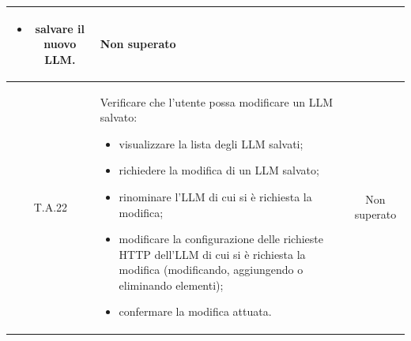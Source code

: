 \begin{tabularx}{\textwidth}{|c|X|c|}
\begin{itemize}
                            \item salvare il nuovo LLM.
                        \end{itemize} & Non superato\\ %
    \hline
    \label{ta:ta22}T.A.22 & Verificare che l'utente possa modificare un LLM salvato:
                        \begin{itemize}
                            \item visualizzare la lista degli LLM salvati;
                            \item richiedere la modifica di un LLM salvato;
                            \item rinominare l'LLM di cui si è richiesta la modifica;
                            \item modificare la configurazione delle richieste HTTP dell'LLM di cui si è richiesta la modifica (modificando, aggiungendo o eliminando elementi);
                            \item confermare la modifica attuata.
                        \end{itemize} & Non superato\\ %
    \hline
\end{tabularx}

